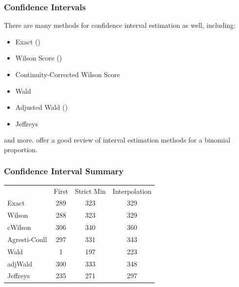 \documentclass{beamer}\usepackage{knitr}
\begin{document}
\begin{frame}
  \frametitle{Confidence Intervals}
  
  There are many methods for confidence interval estimation as well, including:
  \begin{itemize}
    \item Exact (\cite{Clopper1934})
    \item Wilson Score (\cite{Wilson1927})
    \item Continuity-Corrected Wilson Score
    \item Wald
    \item Adjusted Wald (\cite{Agresti1998})
    \item Jeffreys
  \end{itemize}
  and more. \cite{Agresti1998} offer a good review of interval estimation methods for a binomial proportion.
  
\end{frame}


\begin{frame}[fragile]
\frametitle{Confidence Interval Summary}
\begin{center}
  \begin{tabular}{lccc}
              & First & Strict Min & Interpolation \\
    Exact     & 289 & 323 & 329 \\
    Wilson    & 288 & 323 & 329 \\
    cWilson   & 306 & 340 & 360 \\
    Agresti-Coull   & 297 & 331 & 343 \\
    Wald      & 1 & 197 & 223 \\
    adjWald   & 300 & 333 & 348 \\
    Jeffreys  & 235 & 271 & 297 \\
  \end{tabular}
\end{center}
\end{frame}
\end{document}

